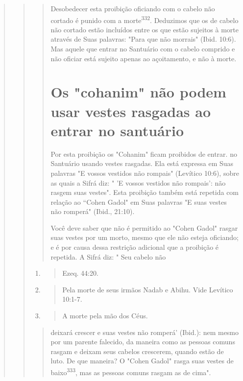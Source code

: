 \begin{quote}
\begin{quote}
\begin{quote}
Desobedecer esta proibição oficiando com o cabelo não cortado é punido
com a morte\textsuperscript{332}. Deduzimos que os de cabelo não cortado
estão incluí­dos entre os que estão sujeitos à morte através de Suas
palavras: "Para que não morrais" (Ibid. 10:6). Mas aquele que entrar no
Santuário com o cabelo com­prido e não oficiar está sujeito apenas ao
açoitamento, e não à morte.

\section{Os "cohanim" não podem usar vestes rasgadas ao entrar no santuário}

Por esta proibição os "Cohanim" ficam proibidos de entrar. no San­tuário
usando vestes rasgadas. Ela está expressa em Suas palavras "E vossos
ves­tidos não rompais" (Levítico 10:6), sobre as quais a Sifrá diz: " 'E
vossos vesti­dos não rompais': não rasgem suas vestes". Esta proibição
também está repeti­da com relação ao ``Cohen Gadol" em Suas palavras "E
suas vestes não rompe­rá" (Ibid., 21:10).

Você deve saber que não é permitido ao "Cohen Gadol" rasgar suas vestes
por um morto, mesmo que ele não esteja oficiando; e é por causa dessa
restrição adicional que a proibição é repetida. A Sifrá diz: " Seu
cabelo não
\end{quote}

\begin{enumerate}
\def\labelenumi{\arabic{enumi}.}
\setcounter{enumi}{329}
\item
 \begin{quote}
 Ezeq. 44:20.
 \end{quote}
\item
 \begin{quote}
 Pela morte de seus irmãos Nadab e Abihu. Vide Levítico 10:1-7.
 \end{quote}
\item
 \begin{quote}
 A morte pela mão dos Céus.
 \end{quote}
\end{enumerate}

\begin{quote}

deixará crescer e suas vestes não romperá' (Ibid.): nem mesmo por um
parente falecido, da maneira como as pessoas comuns rasgam e deixam seus
cabelos crescerem, quando estão de luto. De que maneira? O "Cohen Gadol"
rasga suas vestes de baixo\textsuperscript{333}, mas as pessoas comuns
rasgam as de cima".


\end{quote}
\end{quote}
\end{quote}
